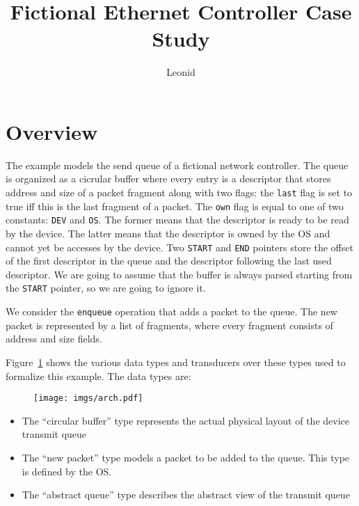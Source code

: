\documentclass{article}
\begin{document}
\pagestyle{headings}  %

\title{Fictional Ethernet Controller Case Study}

\author{Leonid}

\maketitle

\section{Overview}

The example models the send queue of a fictional network controller.  The queue 
is organized as a cicrular buffer where every entry is a descriptor that stores 
address and size of a packet fragment along with two flags: the \texttt{last} 
flag is set to true iff this is the last fragment of a packet.  The 
\texttt{own} flag is equal to one of two constants: \texttt{DEV} and 
\texttt{OS}.  The former means that the descriptor is ready to be read by the 
device.  The latter means that the descriptor is owned by the OS and cannot yet 
be accesses by the device.  Two \texttt{START} and \texttt{END} pointers store
the offset of the first descriptor in the queue and the descriptor following 
the last used descriptor.  We are going to assume that the buffer is always 
parsed starting from the \texttt{START} pointer, so we are going to ignore it.

We consider the \texttt{enqueue} operation that adds a packet to the queue.  
The new packet is represented by a list of fragments, where every fragment 
consists of address and size fields.

Figure~\ref{f:arch} shows the various data types and transducers over these 
types used to formalize this example.  The data types are:

\begin{figure}[t]
    \center
    \texttt{[image: imgs/arch.pdf]}
    \caption{}\label{f:arch}
\end{figure}


\begin{itemize}
    \item The ``circular buffer'' type represents the actual 
        physical layout of the device transmit queue
    \item The ``new packet'' type models a packet to be added to 
        the queue.  This type is defined by the OS.
    \item The ``abstract queue'' type describes the abstract view 
        of the transmit queue
\end{itemize}
\end{document}
